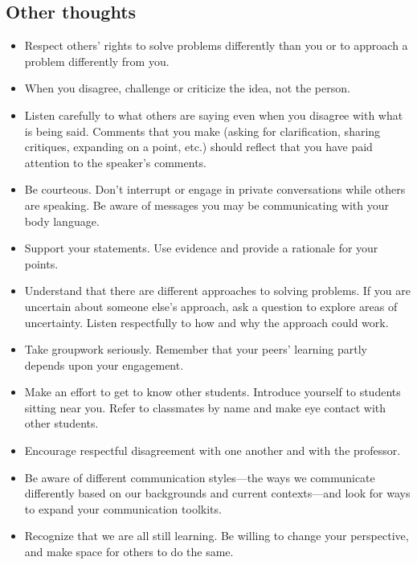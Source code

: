 \documentclass[12pt]{amsart}
\begin{document}
\subsection*{Other thoughts}
\begin{itemize}
\item Respect others' rights to solve problems differently than you or to approach a problem differently from you.
\item When you disagree, challenge or criticize the idea, not the person.
\item Listen carefully to what others are saying even when you disagree with what  is  being  said.   Comments  that  you make (asking  for  clarification, sharing critiques, expanding on a point, etc.)  should reflect that you have paid attention to the speaker’s comments.
\item Be  courteous.  Don’t interrupt or engage in private conversations while others are speaking.   Be aware of messages you may be communicating with your body language.
\item Support your statements.  Use evidence and provide a rationale for your points.
\item Understand that there are different approaches to solving problems.  If you are uncertain  about someone else's approach, ask a question to explore areas of uncertainty.  Listen respectfully to  how and why the approach could work.
\item Take groupwork seriously.  Remember that your peers' learning partly depends upon your engagement.
\item Make an effort to get to know other students.  Introduce yourself to students sitting near you.  Refer to classmates by name and make eye contact with other students.
\item Encourage respectful disagreement with one another and with the professor.
\item Be aware of different communication styles---the ways we communicate differently based on our backgrounds and current contexts---and look for ways to expand your communication toolkits.
\item Recognize that we are all still learning.  Be willing to change your perspective, and make space for others to do the same.
\end{itemize}
\end{document}
